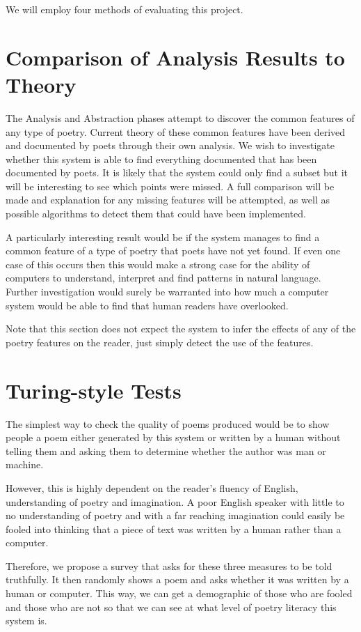 We will employ four methods of evaluating this project.
\section{Comparison of Analysis  Results to Theory}
The Analysis and Abstraction phases attempt to discover the common features of any type of poetry. Current theory of these common features have been derived and documented by poets through their own analysis. We wish to investigate whether this system is able to find everything documented that has been documented by poets. It is likely that the system could only find a subset but it will be interesting to see which points were missed. A full comparison will be made and explanation for any missing features will be attempted, as well as possible algorithms to detect them that could have been implemented. 

A particularly interesting result would be if the system manages to find a common feature of a type of poetry that poets have not yet found. If even one case of this occurs then this would make a strong case for the ability of computers to understand, interpret and find patterns in natural language. Further investigation would surely be warranted into how much a computer system would be able to find that human readers have overlooked.

Note that this section does not expect the system to infer the effects of any of the poetry features on the reader, just simply detect the use of the features.

\section{Turing-style Tests}
The simplest way to check the quality of poems produced would be to show people a poem either generated by this system or written by a human without telling them and asking them to determine whether the author was man or machine.

However, this is highly dependent on the reader's fluency of English, understanding of poetry and imagination. A poor English speaker with little to no understanding of poetry and with a far reaching imagination could easily be fooled into thinking that a piece of text was written by a human rather than a computer.

Therefore, we propose a survey that asks for these three measures to be told truthfully. It then randomly shows a poem and asks whether it was written by a human or computer. This way, we can get a demographic of those who are fooled and those who are not so that we can see at what level of poetry literacy this system is.

